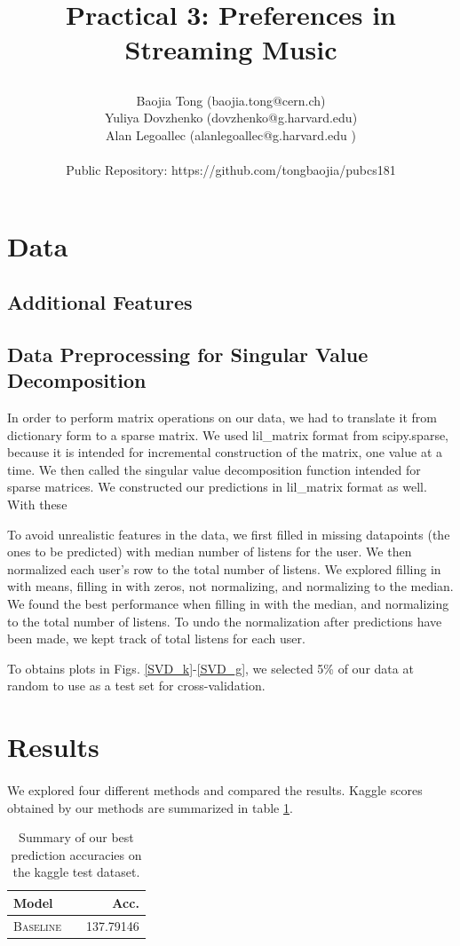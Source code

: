 \documentclass[11pt]{article}
\title{\begin{center}
{\Large Practical 3: Preferences in Streaming Music}
\end{center}}
\author{ Baojia Tong (baojia.tong@cern.ch)\\Yuliya Dovzhenko (dovzhenko@g.harvard.edu)\\Alan Legoallec (alanlegoallec@g.harvard.edu )\\\\Public Repository: https://github.com/tongbaojia/pubcs181}
\begin{document}
\maketitle{}
\section{Data}
\subsection{Additional Features}

\subsection{Data Preprocessing for Singular Value Decomposition}
In order to perform matrix operations on our data, we had to translate it from dictionary form to a sparse matrix. We used lil\_matrix format from scipy.sparse, because it is intended for incremental construction of the matrix, one value at a time. We then called the singular value decomposition function intended for sparse matrices. We constructed our predictions in lil\_matrix format as well. With these 

To avoid unrealistic features in the data, we first  filled in missing datapoints (the ones to be predicted) with median number of listens for the user. We then normalized each user's row to the total number of listens. We explored filling in with means, filling in with zeros, not normalizing, and normalizing to the median. We found the best performance when filling in with the median, and normalizing to the total number of listens. To undo the normalization after predictions have been made, we kept track of total listens for each user. 
 
To obtains plots in Figs. \ref{SVD_k}-\ref{SVD_g}, we selected 5\% of our data at random to use as a test set for cross-validation. 
\paragraph{} 
\section{Results}
\paragraph{} We explored four different methods and compared the results. Kaggle scores obtained by our methods are summarized in table \ref{tab:results}. 
  \begin{table}
\centering
\begin{tabular}{llr}
 \toprule
 Model &  & Acc. \\
 \midrule
 \textsc{Baseline} & &137.79146\\
 \bottomrule
\end{tabular}
\caption{\label{tab:results} Summary of our best prediction accuracies on the kaggle test dataset.}
\end{table}
\end{document}
